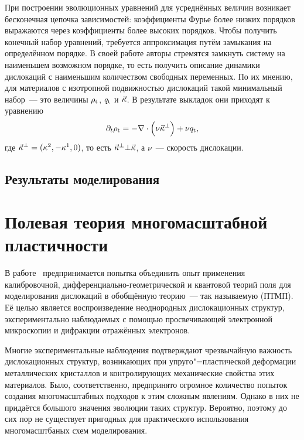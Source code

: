 \documentclass[a4paper, 14pt, titlepage]{extarticle}
\newcommand{\tot}{\textup{t}}    %
\begin{document}
  При построении эволюционных уравнений для усреднённых величин возникает бесконечная цепочка
  зависимостей: коэффициенты Фурье более низких порядков выражаются через коэффициенты более высоких
  порядков. Чтобы получить конечный набор уравнений, требуется аппроксимация путём замыкания на
  определённом порядке. В своей работе авторы стремятся замкнуть систему на наименьшем возможном
  порядке, то есть получить описание динамики дислокаций с наименьшим количеством свободных
  переменных. По их мнению, для материалов с изотропной подвижностью дислокаций такой минимальный
  набор~--- это величины $\rho_\tot$, $q_\tot$ и $\vec{\kappa}$. В результате выкладок они приходят
  к уравнению
  \[
    \partial_t \rho_\tot = - \nabla \cdot \left( \nu \vec{\kappa}^\bot \right) + \nu q_\tot ,
  \]
  где $\vec{\kappa}^\bot = (\kappa^2, -\kappa^1, 0)$, то есть $\vec{\kappa}^\bot \bot \vec{\kappa}$,
  а $\nu$~--- скорость дислокации.


  \subsection{Результаты моделирования}


  \section{Полевая теория многомасштабной пластичности}

  В работе~\cite{hasebe-ftmp} предпринимается попытка объединить опыт применения калибровочной,
  дифференциально-геометрической и квантовой теорий поля для моделирования дислокаций в обобщённую
  теорию~--- так называемую  (ПТМП). Её целью
  является воспроизведение неоднородных дислокационных структур, экспериментально наблюдаемых с
  помощью просвечивающей электронной микроскопии и дифракции отражённых электронов.

  Многие экспериментальные наблюдения подтверждают чрезвычайную важность дислокационных структур,
  возникающих при упруго"=пластической деформации металлических кристаллов и контролирующих
  механические свойства этих материалов. Было, соответственно, предпринято огромное количество
  попыток создания многомасштабных подходов к этим сложным явлениям. Однако в них не придаётся
  большого значения эволюции таких структур. Вероятно, поэтому до сих пор не существует пригодных
  для практического использования многомасштбаных схем моделирования.
\end{document}
